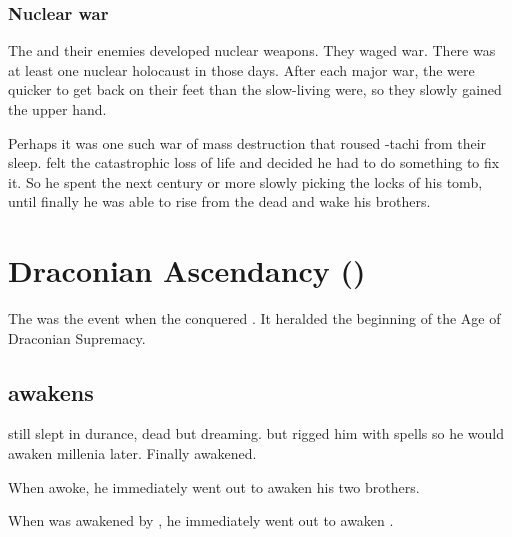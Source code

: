 \subsubsection{Nuclear war}
The \aryothim and their \quiljaaran enemies developed nuclear weapons. 
They waged war. 
There was at least one nuclear holocaust in those days. 
After each major war, the \aryothim were quicker to get back on their feet than the slow-living \quiljaaran were, so they slowly gained the upper hand. 

Perhaps it was one such war of mass destruction that roused \Nexagglachel-tachi from their sleep. 
\Nexagglachel felt the catastrophic loss of life and decided he had to do something to fix it. 
So he spent the next century or more slowly picking the locks of his tomb, until finally he was able to rise from the dead and wake his brothers. 












\section{Draconian Ascendancy ()}
The  was the event when the \dragons conquered \Miith. 
It heralded the beginning of the Age of Draconian Supremacy. 









\subsection{\Nexagglachel awakens}
\Nexagglachel still slept in durance, dead but dreaming.
\Sethicus {} but rigged him with spells so he would awaken millenia later. 
Finally \Nexagglachel awakened. 

When \Nexagglachel awoke, he immediately went out to awaken his two brothers.

When \Ishnaruchaefir was awakened by \Nexagglachel, he immediately went out to awaken \Rystessakhin. 





